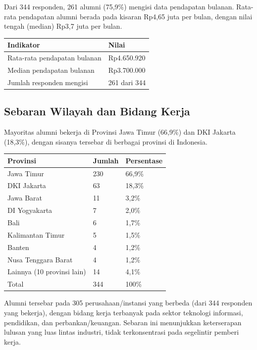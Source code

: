 Dari 344 responden, 261 alumni (75,9\%) mengisi data pendapatan bulanan. Rata-rata pendapatan alumni berada pada kisaran Rp4,65 juta per bulan, dengan nilai tengah (median) Rp3,7 juta per bulan.

\begin{center}
\begin{tabular}{L{7cm}C{4cm}}
\toprule
Indikator & Nilai \\
\midrule
Rata-rata pendapatan bulanan & Rp4.650.920 \\
Median pendapatan bulanan & Rp3.700.000 \\
Jumlah responden mengisi & 261 dari 344 \\
\bottomrule
\end{tabular}
\end{center}

\subsection{Sebaran Wilayah dan Bidang Kerja}

Mayoritas alumni bekerja di Provinsi Jawa Timur (66,9\%) dan DKI Jakarta (18,3\%), dengan sisanya tersebar di berbagai provinsi di Indonesia.

\begin{center}
\begin{tabular}{L{7cm}C{2cm}C{2.5cm}}
\toprule
Provinsi & Jumlah & Persentase \\
\midrule
Jawa Timur & 230 & 66,9\% \\
DKI Jakarta & 63 & 18,3\% \\
Jawa Barat & 11 & 3,2\% \\
DI Yogyakarta & 7 & 2,0\% \\
Bali & 6 & 1,7\% \\
Kalimantan Timur & 5 & 1,5\% \\
Banten & 4 & 1,2\% \\
Nusa Tenggara Barat & 4 & 1,2\% \\
Lainnya (10 provinsi lain) & 14 & 4,1\% \\
\midrule
Total & 344 & 100\% \\
\bottomrule
\end{tabular}
\end{center}

Alumni tersebar pada 305 perusahaan/instansi yang berbeda (dari 344 responden yang bekerja), dengan bidang kerja terbanyak pada sektor teknologi informasi, pendidikan, dan perbankan/keuangan. Sebaran ini menunjukkan keterserapan lulusan yang luas lintas industri, tidak terkonsentrasi pada segelintir pemberi kerja.

